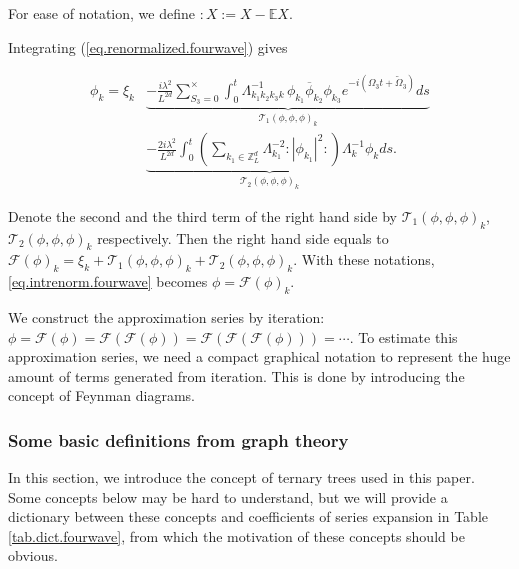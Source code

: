 For ease of notation, we define $:X:=X-\mathbb{E}X$.

Integrating (\ref{eq.renormalized.fourwave}) gives

\begin{equation}\label{eq.intrenorm.fourwave}
\begin{split}
 \phi_k =\xi_k
 &\underbrace{- \frac{i\lambda^2}{L^{2d}} \sum\limits^{\times}_{S_3=0} \int^{t}_0 \Lambda_{k_1k_2k_3k}^{-1}\,\phi_{k_1}\overline{\phi}_{k_2} \phi_{k_3}e^{- i (\Omega_3t+\widetilde{\Omega}_3)} ds}_{\mathcal{T}_1(\phi,\phi,\phi)_k}
 \\
 &\underbrace{- \frac{2i\lambda^2}{L^{2d}} \int^{t}_0 \left(\sum\limits_{k_1\in \mathbb{Z}^d_L} \Lambda_{k_1}^{-2}:|\phi_{k_1}|^2: \right) \Lambda_{k}^{-1}\phi_{k} ds}_{\mathcal{T}_2(\phi,\phi,\phi)_k}.
\end{split}
\end{equation}


Denote the second and the third term of the right hand side by $\mathcal{T}_1(\phi,\phi,\phi)_k$, $\mathcal{T}_2(\phi,\phi,\phi)_k$ respectively. Then the right hand side equals to $\mathcal{F}(\phi)_k=\xi_k+\mathcal{T}_1(\phi,\phi,\phi)_k+\mathcal{T}_2(\phi,\phi,\phi)_k$. With these notations, \eqref{eq.intrenorm.fourwave} becomes $\phi=\mathcal{F}(\phi)_k$. 

We construct the approximation series by iteration: $\phi=\mathcal{F}(\phi)=\mathcal{F}(\mathcal{F}(\phi))=\mathcal{F}(\mathcal{F}(\mathcal{F}(\phi)))=\cdots$. To estimate this approximation series, we need a compact graphical notation to represent the huge amount of terms generated from iteration. This is done by introducing the concept of Feynman diagrams.

\subsubsection{Some basic definitions from graph theory} In this section, we introduce the concept of ternary trees used in this paper. Some concepts below may be hard to understand, but we will 
provide a dictionary between these concepts and coefficients of series expansion in Table \ref{tab.dict.fourwave}, from which the motivation of these concepts should be obvious.


